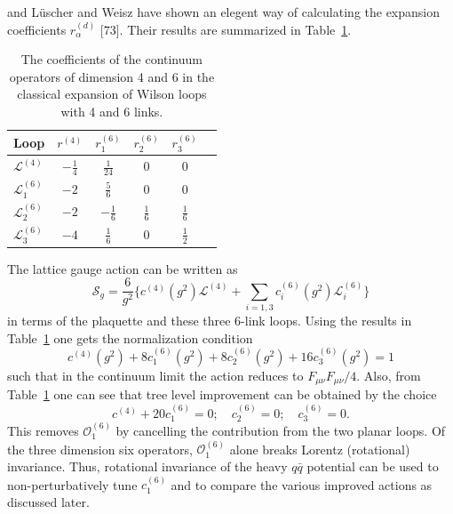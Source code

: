 and L\"uscher and Weisz have shown an elegent way of calculating the
expansion coefficients $r_\alpha^{(d)}$ [73].  Their results are
summarized in Table~\ref{tab:4}.

\begin{table}[htbp]
\centering
\begin{tabular}{lccccc}
\toprule
Loop & $r^{(4)}$ & $r_1^{(6)}$ & $r_2^{(6)}$ & $r_3^{(6)}$\\
\midrule
$\mathcal{L}^{(4)}$  & $-\frac{1}{4}$ & $\frac{1}{24}$ & 0 & 0\\
$\mathcal{L}_1^{(6)}$ & $-2$ & $\frac{5}{6}$ & 0 & 0\\
$\mathcal{L}_2^{(6)}$ & $-2$ & $-\frac{1}{6}$ & $\frac{1}{6}$ & $\frac{1}{6}$\\
$\mathcal{L}_3^{(6)}$ & $-4$ & $\frac{1}{6}$ & 0 & $\frac{1}{2}$\\
\bottomrule
\end{tabular}
\caption{The coefficients of the continuum operators of dimension 4 and
6 in the classical expansion of Wilson loops with 4 and 6 links.}
\label{tab:4}
\end{table}

The lattice gauge action can be written as
\begin{equation}
\mathcal{S}_g = \frac{6}{g^2}\bigg\{c^{(4)}(g^2)\mathcal{L}^{(4)}
    + \sum_{i=1,3} c_i^{(6)}(g^2)\mathcal{L}_i^{(6)}\bigg\}
\label{eq:gaugeimpb}
\end{equation}
in terms of the plaquette and these three 6-link loops.  Using the
results in Table~\ref{tab:4} one gets the normalization condition
\begin{equation}
c^{(4)}(g^2) + 8c_1^{(6)}(g^2) + 8c_2^{(6)}(g^2)
    + 16c_3^{(6)}(g^2) = 1
\label{eq:gaugeimpc}
\end{equation}
such that in the continuum limit the action reduces to
$F_{\mu\nu}F_{\mu\nu}/4$.  Also, from Table~\ref{tab:4} one can see
that tree level improvement can be obtained by the choice
\begin{equation}
c^{(4)} + 20c_1^{(6)} = 0;\quad c_2^{(6)} = 0;\quad c_3^{(6)} = 0.
\label{eq:gaugeclassicalimp}
\end{equation}
This removes $\mathcal{O}_1^{(6)}$ by cancelling the contribution from
the two planar loops.  Of the three dimension six operators,
$\mathcal{O}_1^{(6)}$ alone breaks Lorentz (rotational) invariance.
Thus, rotational invariance of the heavy $q\bar q$ potential can be
used to non-perturbatively tune $c_1^{(6)}$ and to compare the various
improved actions as discussed later.

